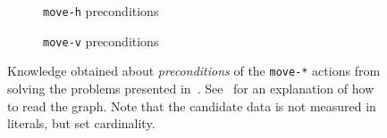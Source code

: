 \documentclass[../Master.tex]{subfiles}
\providecommand{\master}{..}
\begin{document}
\begin{figure}
    \centering
    \begin{subfigure}{0.42\linewidth}
        \resizebox{\linewidth}{!}{}
        \caption{\texttt{move-h} preconditions}\label{fig:res:pkmoveh}
    \end{subfigure}
    \begin{subfigure}{0.42\linewidth}
        \resizebox{\linewidth}{!}{}
        \caption{\texttt{move-v} preconditions}\label{fig:res:pkmovev}
    \end{subfigure}
    \caption{Knowledge obtained about \emph{preconditions} of the \texttt{move-*} actions from solving the problems presented in~. See~ for an explanation of how to read the graph. Note that the candidate data is not measured in literals, but set cardinality.}\label{fig:res:pkmove}
\end{figure}
\end{document}
